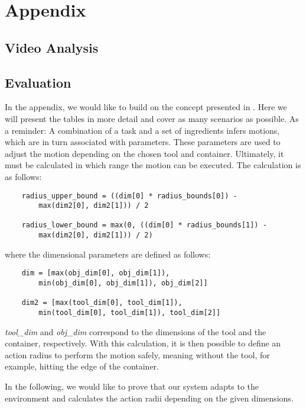 \chapter{Appendix}
\label{chap:appendix}

\section{Video Analysis}
\section{Evaluation}
In the appendix, we would like to build on the concept presented in .
Here we will present the tables in more detail and cover as many scenarios as possible.
As a reminder: A combination of a task and a set of ingredients infers motions, which are in turn associated with parameters.
These parameters are used to adjust the motion depending on the chosen tool and container.
Ultimately, it must be calculated in which range the motion can be executed.
The calculation is as follows:
\begin{lstlisting}
    radius_upper_bound = ((dim[0] * radius_bounds[0]) - 
        max(dim2[0], dim2[1])) / 2

    radius_lower_bound = max(0, ((dim[0] * radius_bounds[1]) - 
        max(dim2[0], dim2[1])) / 2)
\end{lstlisting}
where the dimensional parameters are defined as follows:
\begin{lstlisting}
    dim = [max(obj_dim[0], obj_dim[1]), 
        min(obj_dim[0], obj_dim[1]), obj_dim[2]]

    dim2 = [max(tool_dim[0], tool_dim[1]), 
        min(tool_dim[0], tool_dim[1]), tool_dim[2]]
\end{lstlisting}

\textit{tool\_dim} and \textit{obj\_dim} correspond to the dimensions of the tool and the container, respectively.
With this calculation, it is then possible to define an action radius to perform the motion safely, meaning without the tool, for example, hitting the edge of the container.

In the following, we would like to prove that our system adapts to the environment and calculates the action radii depending on the given dimensions.


